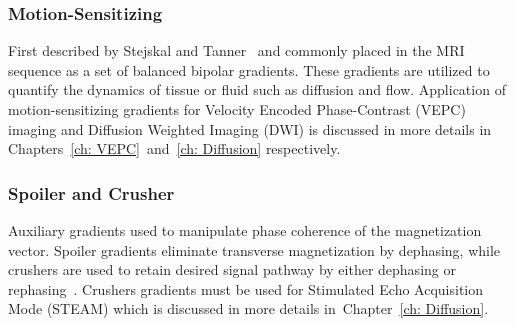 \subsubsection{Motion-Sensitizing}
First described by Stejskal and Tanner~\cite{Stejskal} and commonly placed in the MRI sequence as a set of balanced bipolar gradients. 
These gradients are utilized to quantify the dynamics of  tissue or fluid such as diffusion and flow. 
Application of motion-sensitizing gradients for Velocity Encoded Phase-Contrast (VEPC) imaging and Diffusion Weighted Imaging (DWI) is discussed in more details in Chapters~\ref{ch: VEPC}~and~\ref{ch: Diffusion} respectively.
\subsubsection{Spoiler and Crusher}
Auxiliary gradients used to manipulate phase coherence of the magnetization vector. 
Spoiler gradients eliminate transverse magnetization by dephasing, while crushers are used to retain desired signal pathway by either dephasing or rephasing~\cite{RNDT24}. 
Crushers gradients must be used for Stimulated Echo Acquisition Mode (STEAM) which is discussed in more details in~Chapter~\ref{ch: Diffusion}.
